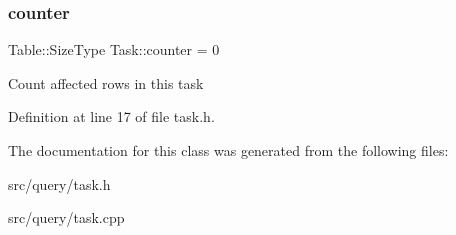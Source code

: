 \subsubsection{\texorpdfstring{counter}{counter}}
{\footnotesize\ttfamily Table\+::\+Size\+Type Task\+::counter = 0\hspace{0.3cm}{\ttfamily [protected]}}

Count affected rows in this task 

Definition at line 17 of file task.\+h.



The documentation for this class was generated from the following files\+:\begin{DoxyCompactItemize}
\item 
src/query/task.\+h\item 
src/query/task.\+cpp\end{DoxyCompactItemize}
